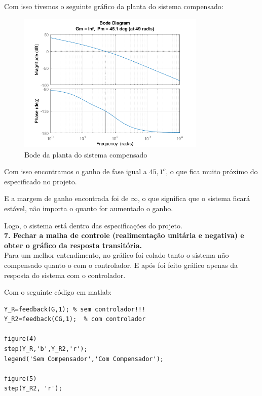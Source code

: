 Com isso tivemos o seguinte gráfico da planta do sistema compensado:

\begin{figure}[H]
  \centering
  \includegraphics[width=0.8\textwidth]{images/fig4.png}
  \caption{Bode da planta do sistema compensado}
\end{figure}

Com isso encontramos o ganho de fase igual a $45,1^o$, o que fica muito próximo do especificado no projeto.

E a margem de ganho encontrada foi de $\infty$, o que significa que o sistema ficará estável, não importa o quanto for aumentado o ganho.

{\color{red} Logo, o sistema está dentro das especificações do projeto.}\\


\noindent \textbf{7. Fechar a malha de controle (realimentação unitária e negativa) e obter o gráfico da resposta transitória.}\\

Para um melhor entendimento, no gráfico foi colado tanto o sistema não compensado quanto o com o controlador. E após foi feito gráfico apenas da resposta do sistema com o controlador.

\noindent Com o seguinte código em matlab:

\begin{lstlisting}[style=matlab]
Y_R=feedback(G,1); % sem controlador!!!
Y_R2=feedback(CG,1);  % com controlador

figure(4)
step(Y_R,'b',Y_R2,'r');
legend('Sem Compensador','Com Compensador');

figure(5)
step(Y_R2, 'r');
\end{lstlisting}\vspace{0.2cm}

